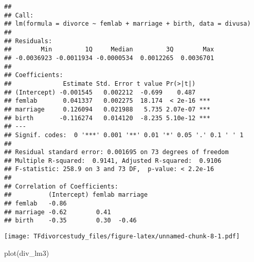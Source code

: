 \documentclass[
]{article}
\newenvironment{Shaded}{\begin{snugshade}}{\end{snugshade}}
\newcommand{\AttributeTok}[1]{\textcolor[rgb]{0.77,0.63,0.00}{#1}}
\newcommand{\CommentTok}[1]{\textcolor[rgb]{0.56,0.35,0.01}{\textit{#1}}}
\newcommand{\ConstantTok}[1]{\textcolor[rgb]{0.00,0.00,0.00}{#1}}
\newcommand{\DecValTok}[1]{\textcolor[rgb]{0.00,0.00,0.81}{#1}}
\newcommand{\FunctionTok}[1]{\textcolor[rgb]{0.00,0.00,0.00}{#1}}
\newcommand{\NormalTok}[1]{#1}
\newcommand{\OtherTok}[1]{\textcolor[rgb]{0.56,0.35,0.01}{#1}}
\newcommand{\SpecialCharTok}[1]{\textcolor[rgb]{0.00,0.00,0.00}{#1}}
\newcommand{\StringTok}[1]{\textcolor[rgb]{0.31,0.60,0.02}{#1}}
\begin{document}
\begin{verbatim}
## 
## Call:
## lm(formula = divorce ~ femlab + marriage + birth, data = divusa)
## 
## Residuals:
##        Min         1Q     Median         3Q        Max 
## -0.0036923 -0.0011934 -0.0000534  0.0012265  0.0036701 
## 
## Coefficients:
##              Estimate Std. Error t value Pr(>|t|)    
## (Intercept) -0.001545   0.002212  -0.699    0.487    
## femlab       0.041337   0.002275  18.174  < 2e-16 ***
## marriage     0.126094   0.021988   5.735 2.07e-07 ***
## birth       -0.116274   0.014120  -8.235 5.10e-12 ***
## ---
## Signif. codes:  0 '***' 0.001 '**' 0.01 '*' 0.05 '.' 0.1 ' ' 1
## 
## Residual standard error: 0.001695 on 73 degrees of freedom
## Multiple R-squared:  0.9141, Adjusted R-squared:  0.9106 
## F-statistic: 258.9 on 3 and 73 DF,  p-value: < 2.2e-16
## 
## Correlation of Coefficients:
##          (Intercept) femlab marriage
## femlab   -0.86                      
## marriage -0.62        0.41          
## birth    -0.35        0.30  -0.46
\end{verbatim}

\begin{Shaded}
\end{Shaded}

\texttt{[image: TFdivorcestudy\_files/figure-latex/unnamed-chunk-8-1.pdf]}

\begin{Shaded}
\begin{Highlighting}[]
\FunctionTok{plot}\NormalTok{(div\_lm3)}
\end{Highlighting}
\end{Shaded}
\end{document}
